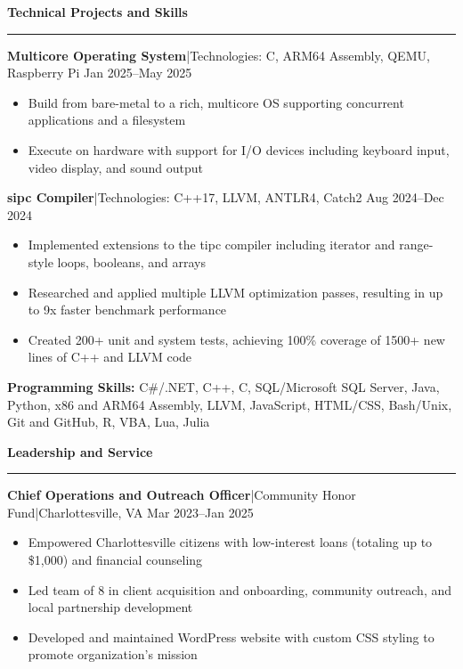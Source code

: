 \documentclass[11pt,letterpaper]{article}
\newcommand{\horibar}[2]{#1\hspace{5pt}|\hspace{5pt}#2}
\newcommand{\sep}[1]{\par\vspace{#1}}
\renewenvironment{section}[1]{
\sep{11pt}
{
\fontsize{14}{2}
\selectfont
\textbf{#1}\\[0.5pt]
}
\sep{6pt}
\noindent\rule{\linewidth}{0.5pt}
\sep{4pt}
}
{
}
\renewenvironment{subsection}[3]
{
\sep{4pt}
\horibar{\textbf{#1}}{#2} \hfill #3
\par\setstretch{1}
\begin{itemize}
}
{
\end{itemize}
\setstretch{0}
}
\begin{document}
\begin{section}{Technical Projects and Skills}
    \begin{subsection}{Multicore Operating System}{Technologies: C, ARM64 Assembly, QEMU, Raspberry Pi}{Jan 2025–May 2025}
        \item Build from bare-metal to a rich, multicore OS supporting concurrent applications and a filesystem
        \item Execute on hardware with support for I/O devices including keyboard input, video display, and sound output
    \end{subsection}
    \begin{subsection}{sipc Compiler}{Technologies: C++17, LLVM, ANTLR4, Catch2}{Aug 2024–Dec 2024}
        \item Implemented extensions to the tipc compiler including iterator and range-style loops, booleans, and arrays
        \item Researched and applied multiple LLVM optimization passes, resulting in up to 9x faster benchmark performance 
        \item Created 200+ unit and system tests, achieving 100\% coverage of 1500+ new lines of C++ and LLVM code
    \end{subsection}
    {
    \sep{2pt}
    \textbf{Programming Skills:} C\#/.NET, C++, C, SQL/Microsoft SQL Server, Java, Python, x86 and ARM64 Assembly, LLVM, JavaScript, HTML/CSS, Bash/Unix, Git and GitHub, R, VBA, Lua, Julia
    \par{}
    \sep{2pt}
    }
\end{section}

\begin{section}{Leadership and Service}
    \begin{subsection}{Chief Operations and Outreach Officer}{\horibar{Community Honor Fund}{Charlottesville, VA}}{Mar 2023–Jan 2025}
        \item Empowered Charlottesville citizens with low-interest loans (totaling up to \$1,000) and financial counseling
        \item Led team of 8 in client acquisition and onboarding, community outreach, and local partnership development
        \item Developed and maintained WordPress website with custom CSS styling to promote organization’s mission
    \end{subsection}
\end{section}
\end{document}
